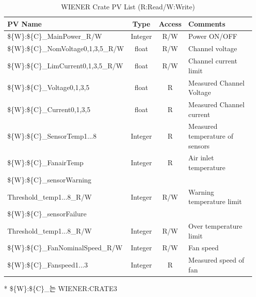 \documentclass[11pt
  , a4paper
  , article
  , oneside
]{memoir}
\begin{document}
\begin{table}[h!]
\begin{center}
\small 
\begin{tabulary}{\textwidth}{L|C|C|L}
PV Name & Type & Access & Comments\\ \hline
 \$\{W\}:\$\{C\}\_MainPower\_R/W & Integer& R/W & Power ON/OFF \\ \hline
 \$\{W\}:\$\{C\}\_NomVoltage0,1,3,5\_R/W & float & R/W & Channel voltage \\ \hline
 \$\{W\}:\$\{C\}\_LimCurrent0,1,3,5\_R/W & float & R/W & Channel current limit \\ \hline
 \$\{W\}:\$\{C\}\_Voltage0,1,3,5 & float & R & Measured Channel Voltage \\ \hline
 \$\{W\}:\$\{C\}\_Current0,1,3,5 & float & R & Measured Channel current \\ \hline
 \$\{W\}:\$\{C\}\_SensorTemp1...8 & Integer & R & Measured temperature of sensors\\ \hline
 \$\{W\}:\$\{C\}\_FanairTemp & Integer & R & Air inlet temperature \\ \hline
 \$\{W\}:\$\{C\}\_sensorWarning&&&\\ Threshold\_temp1...8\_R/W & Integer & R/W & Warning temperature limit\\ \hline
 \$\{W\}:\$\{C\}\_sensorFailure&&&\\Threshold\_temp1...8\_R/W & Integer & R/W & Over temperature limit\\ \hline
 \$\{W\}:\$\{C\}\_FanNominalSpeed\_R/W & Integer & R/W & Fan speed \\ \hline
 \$\{W\}:\$\{C\}\_Fanspeed1...3 & Integer & R & Measured speed of fan \\ \hline
\end{tabulary}
\caption{WIENER Crate PV List (R:Read/W:Write)}{* \$\{W\}:\$\{C\}\_는 WIENER:CRATE3}
  \label{table:wienerpvlist} 
\end{center}
\end{table} 
\end{document}
